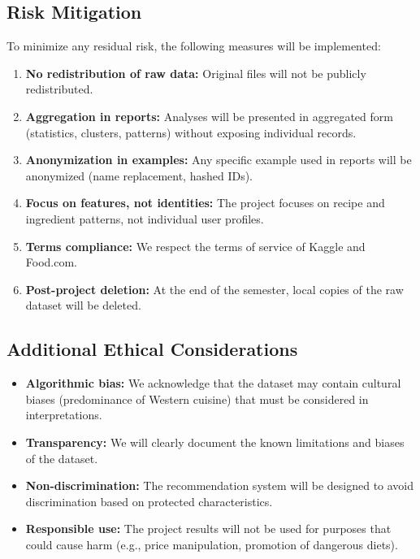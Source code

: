 \documentclass[11pt,a4paper]{article}
\begin{document}
\subsection{Risk Mitigation}

To minimize any residual risk, the following measures will be implemented:

\begin{enumerate}
    \item \textbf{No redistribution of raw data:} Original files will not be publicly redistributed.

    \item \textbf{Aggregation in reports:} Analyses will be presented in aggregated form (statistics, clusters, patterns) without exposing individual records.

    \item \textbf{Anonymization in examples:} Any specific example used in reports will be anonymized (name replacement, hashed IDs).

    \item \textbf{Focus on features, not identities:} The project focuses on recipe and ingredient patterns, not individual user profiles.

    \item \textbf{Terms compliance:} We respect the terms of service of Kaggle and Food.com.

    \item \textbf{Post-project deletion:} At the end of the semester, local copies of the raw dataset will be deleted.
\end{enumerate}

\subsection{Additional Ethical Considerations}

\begin{itemize}
    \item \textbf{Algorithmic bias:} We acknowledge that the dataset may contain cultural biases (predominance of Western cuisine) that must be considered in interpretations.

    \item \textbf{Transparency:} We will clearly document the known limitations and biases of the dataset.

    \item \textbf{Non-discrimination:} The recommendation system will be designed to avoid discrimination based on protected characteristics.

    \item \textbf{Responsible use:} The project results will not be used for purposes that could cause harm (e.g., price manipulation, promotion of dangerous diets).
\end{itemize}
\end{document}
